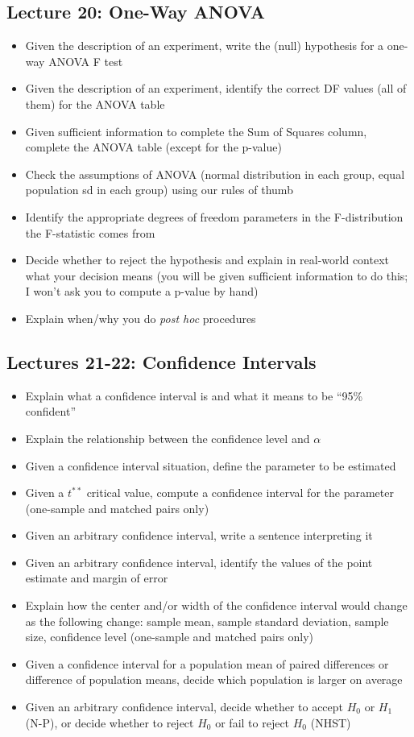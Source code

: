 \documentclass[11pt]{article} %
\begin{document}
\subsection{Lecture 20: One-Way ANOVA}

\begin{itemize}
\item Given the description of an experiment, write the (null) hypothesis for a one-way ANOVA F test
\item Given the description of an experiment, identify the correct DF values (all of them) for the ANOVA table
\item Given sufficient information to complete the Sum of Squares column, complete the ANOVA table (except for the p-value)
\item Check the assumptions of ANOVA (normal distribution in each group, equal population sd in each group) using our rules of thumb
\item Identify the appropriate degrees of freedom parameters in the F-distribution the F-statistic comes from
\item Decide whether to reject the hypothesis and explain in real-world context what your decision means (you will be given sufficient information to do this; I won't ask you to compute a p-value by hand)
\item Explain when/why you do \emph{post hoc} procedures
\end{itemize}

\subsection{Lectures 21-22: Confidence Intervals}

\begin{itemize}
\item Explain what a confidence interval is and what it means to be ``95\% confident''
\item Explain the relationship between the confidence level and $\alpha$
\item Given a confidence interval situation, define the parameter to be estimated
\item Given a $t^{**}$ critical value, compute a confidence interval for the parameter (one-sample and matched pairs only)
\item Given an arbitrary confidence interval, write a sentence interpreting it
\item Given an arbitrary confidence interval, identify the values of the point estimate and margin of error
\item Explain how the center and/or width of the confidence interval would change as the following change: sample mean, sample standard deviation, sample size, confidence level (one-sample and matched pairs only)
\item Given a confidence interval for a population mean of paired differences or difference of population means, decide which population is larger on average
\item Given an arbitrary confidence interval, decide whether to accept $H_0$ or $H_1$ (N-P), or decide whether to reject $H_0$ or fail to reject $H_0$ (NHST)
\end{itemize}
\end{document}
